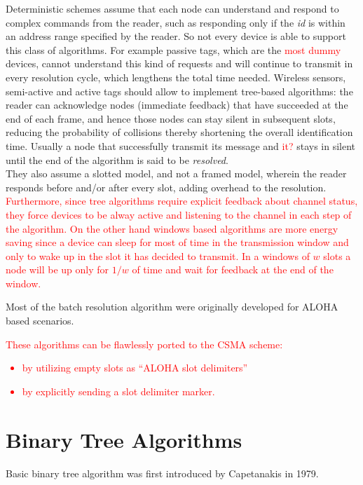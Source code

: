 \documentclass[12pt,a4paper,twocolumns]{report}
\begin{document}
Deterministic schemes assume that each node can understand and respond to complex commands from the reader, such as responding only if the \emph{id} is within an address range specified by the reader. So not every device is able to support this class of algorithms. For example passive tags, which are the \textcolor{red}{most dummy} devices, cannot understand this kind of requests and will continue to transmit in every resolution cycle, which lengthens the total time needed. Wireless sensors, semi-active and active tags should allow to implement tree-based algorithms: the reader can acknowledge nodes (immediate feedback) that have succeeded at the end of each frame, and hence those nodes can stay silent in subsequent slots, reducing the probability of collisions thereby shortening the overall identification time. Usually a node that successfully transmit its message and \textcolor{red}{it?} stays in silent until the end of the algorithm is said to be \emph{resolved}.\\
They also assume a slotted model, and not a framed model, wherein the reader responds before and/or after every slot, adding overhead to the resolution.\\
\textcolor{red}{
Furthermore, since tree algorithms require explicit feedback about channel status, they force devices to be alway active and listening to the channel in each step of the algorithm.
On the other hand windows based algorithms are more energy saving since a device can sleep for most of time in the transmission window and only to wake up in the slot it has decided to transmit. In a windows of $w$ slots  a node will be up only for $1/w$ of time and wait for feedback at the end of the window.}


Most of the batch resolution algorithm were originally developed for ALOHA based scenarios.\\
\textcolor{red}{
These algorithms can be flawlessly ported to the CSMA scheme:
\begin{itemize}
\item by utilizing empty slots as ``ALOHA slot delimiters''
\item by explicitly sending a slot delimiter marker.
\end{itemize}
} 
 
\section{Binary Tree Algorithms}
Basic binary tree algorithm was first introduced by Capetanakis in 1979.
\end{document}
